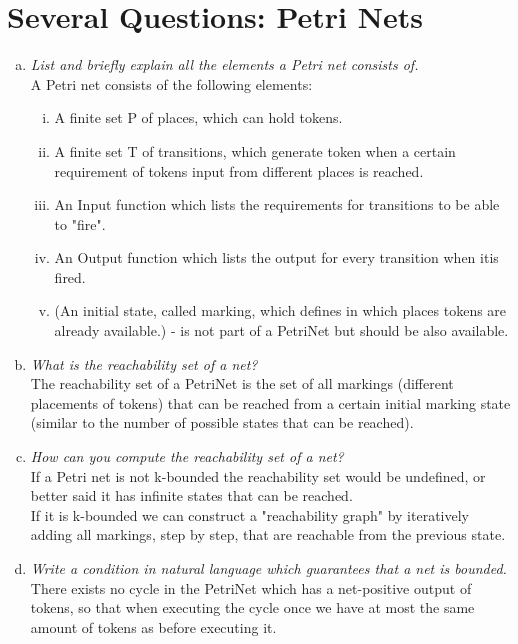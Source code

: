 \documentclass{report}
\author{Marcel \textsc{Zauder} 16-124-836 \\
	Pascal \textsc{Gerig} 16-104-721}
\begin{document}
	\section{Several Questions: Petri Nets}
	\startsection
		\begin{enumerate}[a)]
			\item \textit{List and briefly explain all the elements a Petri net consists of.} \\
			A Petri net consists of the following elements:
			\begin{enumerate}[(i)]
				\item A finite set P of places, which can hold tokens.
				\item A finite set T of transitions, which generate token when a certain requirement of tokens input from different places is reached.
				\item An Input function which lists the requirements for transitions to be able to "fire".
				\item An Output function which lists the output for every transition when itis fired.
				\item (An initial state, called marking, which defines in which places tokens are already available.) - is not part of a PetriNet but should be also available.
			\end{enumerate}
			\item \textit{What is the reachability set of a net?} \\
			The reachability set of a PetriNet is the set of all markings (different placements of tokens) that can be reached from a certain initial marking state (similar to the number of possible states that can be reached).
			\item \textit{How can you compute the reachability set of a net?} \\
			If a Petri net is not k-bounded the reachability set would be undefined, or better said it has infinite states that can be reached. \\
			If it is k-bounded we can construct a "reachability graph" by iteratively adding all markings, step by step, that are reachable from the previous state.
			\item \textit{Write a condition in natural language which guarantees that a net is bounded.} \\
			There exists no cycle in the PetriNet which has a net-positive output of tokens, so that when executing the cycle once we have at most the same amount of tokens as before executing it.
		\end{enumerate}
	\closesection
	
\end{document}
